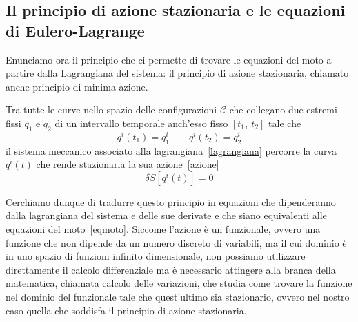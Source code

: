 \subsection{Il principio di azione stazionaria e le equazioni di Eulero-Lagrange}

    Enunciamo ora il principio che ci permette di trovare le equazioni del moto a partire dalla Lagrangiana del sistema: il principio di azione stazionaria, chiamato anche principio di minima azione.

    \begin{principle}
        Tra tutte le curve nello spazio delle configurazioni $\mathcal C$ che collegano due estremi fissi $q_1$ e $q_2$ di un intervallo temporale anch'esso fisso $[t_1, ~t_2]$ tale che 
    \begin{equation*}
        q^i(t_1) = q^i_1 \qquad q^i(t_2) = q^i_2
    \end{equation*}
        il sistema meccanico associato alla lagrangiana~\eqref{lagrangiana} percorre la curva $q^i(t)$ che rende stazionaria la sua azione~\eqref{azione}
    \begin{equation} \label{azionestazionaria}
        \delta S [q^i(t)] = 0
    \end{equation}
    \end{principle}

    Cerchiamo dunque di tradurre questo principio in equazioni che dipenderanno dalla lagrangiana del sistema e delle sue derivate e che siano equivalenti alle equazioni del moto~\eqref{eqmoto}. Siccome l'azione è un funzionale, ovvero una funzione che non dipende da un numero discreto di variabili, ma il cui dominio è in uno spazio di funzioni infinito dimensionale, non possiamo utilizzare direttamente il calcolo differenziale ma è necessario attingere alla branca della matematica, chiamata calcolo delle variazioni, che studia come trovare la funzione nel dominio del funzionale tale che quest'ultimo sia stazionario, ovvero nel nostro caso quella che soddisfa il principio di azione stazionaria. 
    
